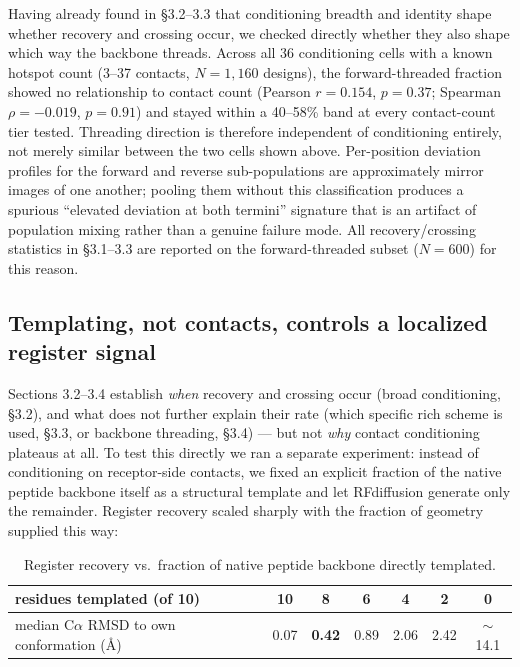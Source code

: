 \documentclass[letterpaper]{article}
\begin{document}
Having already found in \S3.2--3.3 that conditioning breadth and identity shape whether recovery and
crossing occur, we checked directly whether they also shape which way the backbone threads. Across all 36
conditioning cells with a known hotspot count (3--37 contacts, $N=1{,}160$ designs), the forward-threaded
fraction showed no relationship to contact count (Pearson $r=0.154$, $p=0.37$; Spearman $\rho=-0.019$,
$p=0.91$) and stayed within a 40--58\% band at every contact-count tier tested. Threading direction is
therefore independent of conditioning entirely, not merely similar between the two cells shown above.
Per-position deviation profiles for the forward and reverse sub-populations are approximately mirror
images of one another; pooling them without this classification produces a spurious ``elevated deviation
at both termini'' signature that is an artifact of population mixing rather than a genuine failure mode.
All recovery/crossing statistics in \S3.1--3.3 are reported on the forward-threaded subset ($N=600$) for
this reason.

\subsection{Templating, not contacts, controls a localized register signal}

Sections 3.2--3.4 establish \textit{when} recovery and crossing occur (broad conditioning, \S3.2), and
what does not further explain their rate (which specific rich scheme is used, \S3.3, or backbone
threading, \S3.4) --- but not \textit{why} contact conditioning plateaus at all. To test this directly we
ran a separate experiment: instead of conditioning on receptor-side contacts, we fixed an explicit
fraction of the native peptide backbone itself as a structural template and let RFdiffusion generate only
the remainder. Register recovery scaled sharply with the fraction of geometry supplied this way:

\begin{table}[t]
\centering
\small
\begin{tabular}{lcccccc}
\toprule
residues templated (of 10) & 10 & 8 & 6 & 4 & 2 & 0 \\
\midrule
median C$\alpha$ RMSD to own conformation (\AA{}) & 0.07 & \textbf{0.42} & 0.89 & 2.06 & 2.42 & $\sim$14.1 \\
\bottomrule
\end{tabular}
\caption{Register recovery vs.\ fraction of native peptide backbone directly templated.}
\label{tab:templating}
\end{table}
\end{document}
